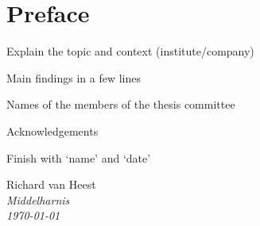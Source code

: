 \chapter*{Preface}

\itemize
	\item Explain the topic and context (institute/company)
	\item Main findings in a few lines
	\item Names of the members of the thesis committee
	\item Acknowledgements
	\item Finish with ‘name’ and ‘date’

\begin{flushright}
Richard van Heest\\
\textit{Middelharnis}\\
\textit{\monthyeardate\today}
\end{flushright}